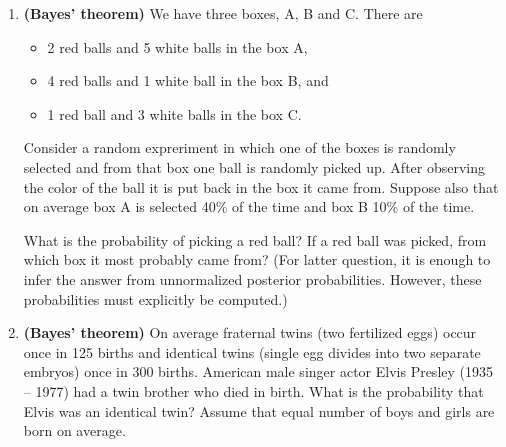 \documentclass[11pt,a4paper,english]{article}
\begin{document}
\begin{enumerate}
\item {\bf (Bayes' theorem)} We have three boxes, A, B and C. There are
  \begin{itemize}
    \item 2 red balls and 5 white balls in the box A,
    \item 4 red balls and 1 white ball in the box B, and
    \item 1 red ball and 3 white balls in the box C.
  \end{itemize}
Consider a random expreriment in which one of the boxes is randomly
selected and from that box one ball is randomly picked up. After
observing the color of the ball it is put back in the box it came
from. Suppose also that on average box A is selected 40\% of the time
and box B 10\% of the time.

What is the probability of picking a red ball? If a red ball was
picked, from which box it most probably came from? (For latter question, it is enough to infer the answer from unnormalized posterior probabilities. However, these probabilities must explicitly be computed.)



\item {\bf (Bayes' theorem)} On average fraternal twins (two fertilized eggs) occur once in 125
births and identical twins (single egg divides into two separate
embryos) once in 300 births.
American male singer actor Elvis Presley (1935 -- 1977) had a twin brother who died in birth.
What is the probability that Elvis was an identical twin?
Assume that equal number of boys and girls are born on average.
\end{enumerate}
\end{document}
